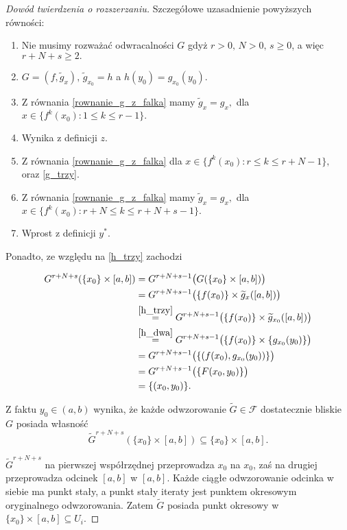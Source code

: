 \documentclass[licencjacka]{pwr_wmat_praca_dyplomowa}
\theoremstyle{plain}
\numberwithin{theorem}{chapter}
\theoremstyle{definition}
\numberwithin{theorem}{chapter}
\begin{document}
\begin{proof}[Dowód twierdzenia o rozszerzaniu]
Szczegółowe uzasadnienie powyższych równości:
\begin{enumerate}
\item Nie musimy rozważać odwracalności $G$ gdyż $r > 0, \, N > 0, \, s \geq 0$, a więc $r+N+s \geq 2.$
\item $G = (f, \widetilde{g}_x), \, \widetilde{g}_{x_0} = h$ a $h(y_0) = g_{x_0}(y_0).$
\item Z równania \ref{rownanie_g_z_falka} mamy $\widetilde{g}_x = g_x,$ dla $x \in \{f^k(x_0) : 1 \leq k \leq r-1\}.$
\item Wynika z definicji $z.$
\item Z równania \ref{rownanie_g_z_falka} dla $x \in \{f^k(x_0) : r \leq k \leq r+N-1\},$ oraz \ref{g_trzy}.
\item Z równania \ref{rownanie_g_z_falka} mamy $\widetilde{g}_x = g_x,$ dla $x \in \{f^k(x_0) : r+N \leq k \leq r+N+s-1\}.$
\item Wprost z definicji $y^*.$
\end{enumerate}

Ponadto, ze względu na \ref{h_trzy} zachodzi

\begin{equation}
\begin{aligned}
G^{r+N+s}(\{x_0\} \times [a, b]) & = G^{r+N+s-1}\big(G(\{x_0\} \times [a, b])\big) \\
& = G^{r+N+s-1}\big(\{f(x_0)\} \times \widetilde{g}_x([a,b])\big) \\
& \stackrel{\ref{h_trzy}}{=} G^{r+N+s-1}\big(\{f(x_0)\} \times \widetilde{g}_{x_0}([a,b])\big) \\
& \stackrel{\ref{h_dwa}}{=} G^{r+N+s-1}\big(\{f(x_0)\} \times \{g_{x_0}(y_0)\}\big) \\
& = G^{r+N+s-1}\big(\{(f(x_0), g_{x_0}(y_0))\}\big) \\
& = G^{r+N+s-1}\big(\{F(x_0, y_0)\}\big) \\
& = \{(x_0, y_0)\}.
\end{aligned}
\end{equation}


Z faktu $y_0 \in (a, b)$ wynika, że każde odwzorowanie $\widetilde{G} \in \mathcal{F}$ dostatecznie bliskie $G$ posiada własność
$$\widetilde{G}^{r+N+s}(\{x_0\} \times [a, b]) \subseteq \{x_0\} \times [a, b].$$

$\widetilde G^{r+N+s}$ na pierwszej współrzędnej przeprowadza $x_0$ na $x_0$, zaś na drugiej przeprowadza odcinek $[a,b]$ w $[a,b]$. Każde ciągłe odwzorowanie odcinka w siebie ma punkt stały, a punkt stały iteraty jest punktem okresowym oryginalnego odwzorowania.
Zatem $\widetilde{G}$ posiada punkt okresowy w $\{x_0\} \times [a, b] \subseteq U_i$.


\end{proof}
\end{document}
